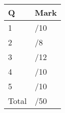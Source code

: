\documentclass[12pt]{article}
\begin{document}
\begin{table}[hbt]
\begin{center}
\begin{tabular}{|l|l|} \hline
Q&Mark\\
\hline \hline
\cline{1-2} 1 & \enspace\enspace\enspace\enspace\enspace\enspace/10\\
\cline{1-2} 2 & \enspace\enspace\enspace\enspace\enspace\enspace/8\\
\cline{1-2} 3 & \enspace\enspace\enspace\enspace\enspace\enspace/12\\
\cline{1-2} 4 & \enspace\enspace\enspace\enspace\enspace\enspace/10\\
\cline{1-2} 5 & \enspace\enspace\enspace\enspace\enspace\enspace/10\\
\cline{1-2} Total & \enspace\enspace\enspace\enspace\enspace\enspace/50\\
\hline
\end{tabular}
\end{center}
\end{table}
\newpage
\end{document}
